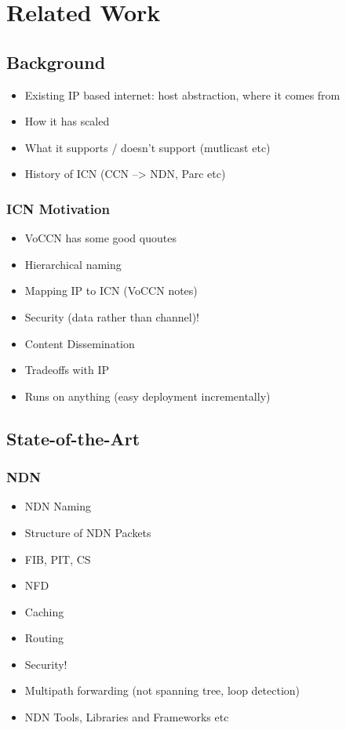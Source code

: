 \chapter{Related Work}
\section{Background}
\begin{itemize}
    \item Existing IP based internet: host abstraction, where it comes from
    \item How it has scaled
    \item What it supports / doesn't support (mutlicast etc)
    \item History of ICN (CCN --> NDN, Parc etc)
\end{itemize}


\subsection{ICN Motivation}
\begin{itemize}
    \item VoCCN  has some good quoutes
    \item Hierarchical naming
    \item Mapping IP to ICN (VoCCN notes)
    \item Security (data rather than channel)!
    \item Content Dissemination
    \item Tradeoffs with IP
    \item Runs on anything (easy deployment incrementally)
\end{itemize}


\section{State-of-the-Art}

\subsection{NDN}
\begin{itemize}
    \item NDN Naming
    \item Structure of NDN Packets
    \item FIB, PIT, CS
    \item NFD
    \item Caching
    \item Routing
    \item Security!
    \item Multipath forwarding (not spanning tree, loop detection)
    \item NDN Tools, Libraries and Frameworks etc
\end{itemize}

